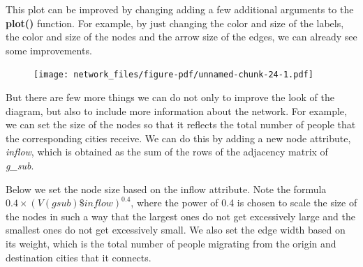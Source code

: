 \documentclass[
  letterpaper,
  DIV=11,
  numbers=noendperiod]{scrreprt}
\newenvironment{Shaded}{\begin{snugshade}}{\end{snugshade}}
\newcommand{\AttributeTok}[1]{\textcolor[rgb]{0.40,0.45,0.13}{#1}}
\newcommand{\DecValTok}[1]{\textcolor[rgb]{0.68,0.00,0.00}{#1}}
\newcommand{\FloatTok}[1]{\textcolor[rgb]{0.68,0.00,0.00}{#1}}
\newcommand{\FunctionTok}[1]{\textcolor[rgb]{0.28,0.35,0.67}{#1}}
\newcommand{\NormalTok}[1]{\textcolor[rgb]{0.00,0.23,0.31}{#1}}
\newcommand{\OtherTok}[1]{\textcolor[rgb]{0.00,0.23,0.31}{#1}}
\newcommand{\SpecialCharTok}[1]{\textcolor[rgb]{0.37,0.37,0.37}{#1}}
\newcommand{\StringTok}[1]{\textcolor[rgb]{0.13,0.47,0.30}{#1}}
\begin{document}
This plot can be improved by changing adding a few additional arguments
to the \textbf{plot()} function. For example, by just changing the color
and size of the labels, the color and size of the nodes and the arrow
size of the edges, we can already see some improvements.

\begin{Shaded}
\end{Shaded}

\begin{figure}[H]

{\centering \texttt{[image: network\_files/figure-pdf/unnamed-chunk-24-1.pdf]}

}

\end{figure}

But there are few more things we can do not only to improve the look of
the diagram, but also to include more information about the network. For
example, we can set the size of the nodes so that it reflects the total
number of people that the corresponding cities receive. We can do this
by adding a new node attribute, \emph{inflow}, which is obtained as the
sum of the rows of the adjacency matrix of \emph{g\_sub}.

\begin{Shaded}
\end{Shaded}

Below we set the node size based on the inflow attribute. Note the
formula \(0.4\times(V(gsub)\$inflow)^{0.4}\), where the power of 0.4 is
chosen to scale the size of the nodes in such a way that the largest
ones do not get excessively large and the smallest ones do not get
excessively small. We also set the edge width based on its weight, which
is the total number of people migrating from the origin and destination
cities that it connects.
\end{document}
